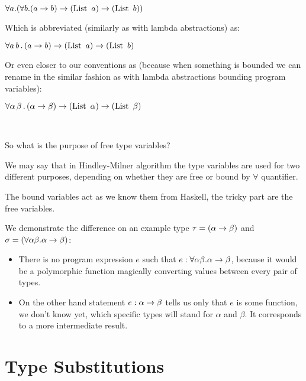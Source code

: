 \documentclass[a4paper,oneside]{memoir}
\begin{document}
$\forall a . (\forall b . (a \rightarrow b) \rightarrow (\operatorname{List}~a) \rightarrow (\operatorname{List}~b))$

Which is abbreviated (similarly as with lambda abstractions) as:

$\forall a\,b\,.\,(a \rightarrow b) \rightarrow (\operatorname{List}~a) \rightarrow (\operatorname{List}~b)$

Or even closer to our conventions as (because when something is bounded we can rename in the similar fashion as with lambda abstractions bounding program variables):

$\forall \alpha\,\beta\,.\,(\alpha \rightarrow \beta) \rightarrow (\operatorname{List}~\alpha) \rightarrow (\operatorname{List}~\beta)$

~

So what is the purpose of free type variables?

We may say that in Hindley-Milner algorithm the type variables are used for two different purposes, depending on whether they are free or bound by $\forall$ quantifier.

The bound variables act as we know them from Haskell, the tricky part are the free variables.



We demonstrate the difference 
on an example type $\tau = (\alpha \rightarrow \beta)$ and $\sigma = (\forall \alpha \beta . \alpha \rightarrow \beta)$:
\begin{itemize}
\item There is no program expression $e$ such that $e : \forall \alpha \beta . \alpha \rightarrow \beta$, because it would be a polymorphic function magically converting values between every pair of types.
\item On the other hand statement $e : \alpha \rightarrow \beta$ tells us only that $e$ is some function, we don't know yet, which specific types will stand for $\alpha$ and $\beta$. It corresponds to a more intermediate result.    

\end{itemize}





\section{Type Substitutions}
\end{document}

